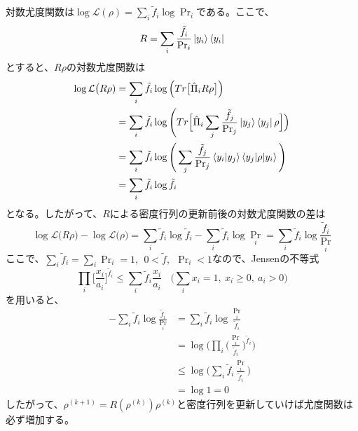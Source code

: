 \documentclass[11pt,a4j,notitlepage]{jreport}
\begin{document}
	対数尤度関数は$\log \mathcal{L} (\rho) = \sum_i \tilde{f}_i \log \Pr_i$である。ここで、
	\begin{equation}
		R = \sum_i \frac{\tilde{f}_i}{\Pr_i} \ket{y_i} \bra{y_i}
	\end{equation}
	とすると、$R \rho$の対数尤度関数は
	\begin{equation}
		\begin{aligned}
			\log \mathcal{L} \big( R \rho) &= \sum_i \tilde{f}_i \log \Big( Tr \big[ \hat{\Pi}_i R \rho \big] \Big) \\
			&=  \sum_i \tilde{f}_i \log \Bigg( Tr \Big[ \hat{\Pi}_i \sum_j \frac{\tilde{f}_j}{\Pr_j} \ket{y_j} \bra{y_j} \rho \Big] \Big) \\
			&= \sum_i \tilde{f}_i \log \Bigg( \sum_j \frac{\tilde{f}_j}{\Pr_j} \braket{y_i | y_j} \braket{y_j | \rho | y_i} \Bigg) \\
			&= \sum_i \tilde{f}_i \log \tilde{f}_i
		\end{aligned}
	\end{equation}
	となる。したがって、$R$による密度行列の更新前後の対数尤度関数の差は
	\begin{equation}
		\log \mathcal{L} \big( R \rho \big) - \log \mathcal{L} \big( \rho \big) = \sum_i \tilde{f}_i \log \tilde{f}_i - \sum_i \tilde{f}_i \log \Pr_i = \sum_i \tilde{f}_i \log \frac{\tilde{f}_i}{\Pr_i}
	\end{equation}
	ここで、$\sum_i \tilde{f}_i = \sum_i \Pr_i = 1,\ \ 0 < \tilde{f},\ \ \Pr_i < 1$なので、Jensenの不等式
	\begin{equation}
		\prod_i \Big[ \frac{x_i}{a_i} \Big]^{\tilde{f}_i} \leq \sum_i \tilde{f}_i \frac{x_i}{a_i} \ \ \ \ \Big( \sum_i x_i = 1,\ x_i \geq 0,\ a_i > 0 \Big)
	\end{equation}
	を用いると、
	\begin{equation}
		\begin{aligned}
			- \sum_i \tilde{f}_i \log \frac{\tilde{f}_i}{\Pr_i} &= \sum_i \tilde{f}_i \log \frac{\Pr_i}{\tilde{f}_i} \\
			&= \log \Bigg( \prod_i \Big( \frac{\Pr_i}{\tilde{f}_i} \Big)^{\tilde{f}_i} \Bigg) \\
			&\leq \log \Big( \sum_i \tilde{f}_i \frac{\Pr_i}{\tilde{f}_i} \Big) \\
			&= \log 1 = 0
		\end{aligned}
	\end{equation}
	したがって、$\rho^{(k+1)} = R (\rho^{(k)}) \rho^{(k)}$と密度行列を更新していけば尤度関数は必ず増加する。
\end{document}
